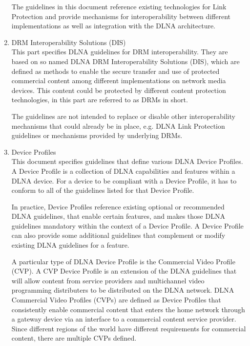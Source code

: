 \begin{enumerate}
The guidelines in this document reference existing technologies for Link Protection and provide mechanisms for interoperability between different implementations as well as integration with the DLNA architecture. 
\item DRM Interoperability Solutions (DIS) \\
This part specifies DLNA guidelines for DRM interoperability. They are based on so named DLNA DRM Interoperability Solutions (DIS), which are defined as methods to enable the secure transfer  and use of protected commercial content among different implementations on network media devices. This content could be protected by different content protection technologies, in this part are referred to as DRMs in short.

The guidelines are not intended to replace or disable other interoperability mechanisms that could already be in place, e.g. DLNA Link Protection guidelines or mechanisms provided by underlying DRMs.
\item Device Profiles \\
This document specifies guidelines that define various DLNA Device Profiles. A Device Profile is a collection of DLNA capabilities and features within a DLNA device. For a device to be compliant with a Device Profile, it has to conform to all of the guidelines listed for that Device Profile.

In practice, Device Profiles reference existing optional or recommended DLNA guidelines, that enable certain features, and makes those DLNA guidelines mandatory within the context of a Device Profile.  A Device Profile can also provide some additional guidelines that complement or modify existing DLNA guidelines for a feature.

A particular type of DLNA Device Profile is the Commercial Video Profile (CVP). A CVP Device Profile is an extension of the DLNA guidelines that will allow content from service providers and multichannel video programming distributers to be distributed on the DLNA network. DLNA Commercial Video Profiles (CVPs) are defined as Device Profiles that consistently enable commercial content that enters the home network through a gateway device via an interface to a commercial content service provider. Since different regions of the world have different requirements for commercial content, there are multiple CVPs defined.

\end{enumerate}

